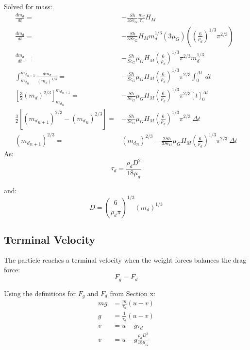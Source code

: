\documentclass[../Interim_Report_Master]{subfiles}
\begin{document}
Solved for mass:
\begin{subequations}
\begin{align}
\frac{dm_d}{dt} =& -\frac{Sh}{3Sc_G}\frac{m_d}{\tau_d}H_M \\
\frac{dm_d}{dt} =& -\frac{Sh}{3Sc_G} H_M m_d^{1/3}(3\mu_G)\left(\left(\frac{6}{\rho_d}\right)^{1/3}\pi^{2/3} \right)\\
\frac{dm_d}{dt} =& -\frac{Sh}{Sc_G}\mu_G H_M \left(\frac{6}{\rho_d}\right)^{1/3}\pi^{2/3} m_d^{1/3}\\
\int_{{m_d}_n}^{{m_d}_{n+1}} \frac{dm_d}{\left(m_d\right)^{1/3}} =& -\frac{Sh}{Sc_G}\mu_G H_M \left(\frac{6}{\rho_d}\right)^{1/3}\pi^{2/3}\int_{0}^{\Delta t} ~ dt \\
\left[\frac{3}{2}\left(m_d\right)^{2/3}\right]_{{m_d}_n}^{{m_d}_{n+1}} =& -\frac{Sh}{Sc_G}\mu_G H_M \left(\frac{6}{\rho_d}\right)^{1/3}\pi^{2/3} \left[t\right]_{0}^{\Delta t} \\
\frac{3}{2}\left[\left({m_d}_{n+1}\right)^{2/3} - \left({m_d}_{n}\right)^{2/3}\right] =& -\frac{Sh}{Sc_G}\mu_G H_M \left(\frac{6}{\rho_d}\right)^{1/3}\pi^{2/3} ~ \Delta t \\
\left({m_d}_{n+1}\right)^{2/3} =& \left({m_d}_{n}\right)^{2/3} - \frac{2Sh}{3Sc_G}\mu_G H_M \left(\frac{6}{\rho_d}\right)^{1/3}\pi^{2/3} ~ \Delta t
\end{align}
\end{subequations}
As:
\begin{equation}
\tau_d = \frac{\rho_d D^2}{18\mu_g}
\end{equation}

and:
\begin{equation}
D = \left(\frac{6}{\rho_d \pi}\right)^{1/3} \left(m_d\right)^{1/3}
\end{equation}

\subsection{Terminal Velocity}
The particle reaches a terminal velocity when the weight forces balances the drag force:
\begin{equation}
F_g = F_d
\end{equation}

Using the definitions for $F_g$ and $F_d$ from Section x:
\begin{subequations}
\begin{align}
mg &= \frac{m}{\tau_d}(u-v) \\
g &= \frac{1}{\tau_d}(u-v) \\
v &= u - g\tau_d \\
v &= u -g\frac{\rho_d D^2}{18\mu_G}
\end{align}
\end{subequations}
\end{document}
